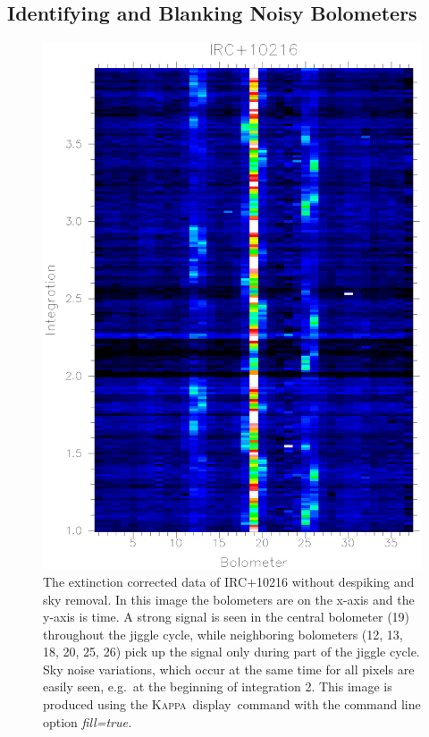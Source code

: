 \documentclass[twoside,11pt]{article}
\newcommand{\Kappa}{\xref{\textsc{Kappa}}{sun95}{}}
\newcommand{\task}[1]{\textsf{#1}}
\newcommand{\display}{\xref{\task{display}}{sun95}{DISPLAY}}
\newcommand{\xref}[3]{#1}
\newcommand{\xlabel}[1]{}
\renewcommand{\_}{\texttt{\symbol{95}}}
\begin{document}
\subsection{\xlabel{Blanking}Identifying and Blanking Noisy 
Bolometers}

\begin{figure}
\begin{center}
\includegraphics[width=5.4in]{sc11_fig2.eps}
\caption{The extinction corrected data of IRC$+$10216 without
despiking and sky removal.  In this image the bolometers are on the
x-axis and the y-axis is time. A strong signal is seen in the central 
bolometer (19) throughout the jiggle cycle, while neighboring 
bolometers (12, 13, 18, 20, 25, 26) pick up the signal only during 
part of the jiggle cycle. Sky noise variations, which occur at
the same time for all pixels are easily seen, e.g.\ at the beginning
of integration 2.  This image is produced using the \Kappa\ \display\
command with the command line option \it{fill=true}. }

\label{fig:raw}
\end{center}
\end{figure}
\end{document}
